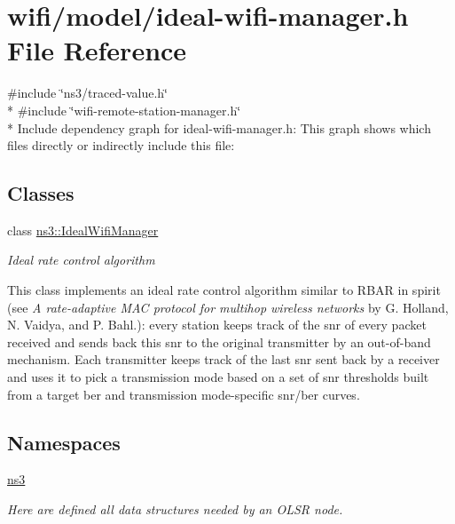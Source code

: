\hypertarget{ideal-wifi-manager_8h}{}\section{wifi/model/ideal-\/wifi-\/manager.h File Reference}
\label{ideal-wifi-manager_8h}
{\ttfamily \#include \char`\"{}ns3/traced-\/value.\+h\char`\"{}}\\*
{\ttfamily \#include \char`\"{}wifi-\/remote-\/station-\/manager.\+h\char`\"{}}\\*
Include dependency graph for ideal-\/wifi-\/manager.h\+:
This graph shows which files directly or indirectly include this file\+:
\subsection*{Classes}
\begin{DoxyCompactItemize}
\item 
class \hyperlink{classns3_1_1IdealWifiManager}{ns3\+::\+Ideal\+Wifi\+Manager}
\begin{DoxyCompactList}\small\item\em Ideal rate control algorithm

This class implements an \textquotesingle{}ideal\textquotesingle{} rate control algorithm similar to R\+B\+AR in spirit (see {\itshape A rate-\/adaptive M\+AC protocol for multihop wireless networks} by G. Holland, N. Vaidya, and P. Bahl.)\+: every station keeps track of the snr of every packet received and sends back this snr to the original transmitter by an out-\/of-\/band mechanism. Each transmitter keeps track of the last snr sent back by a receiver and uses it to pick a transmission mode based on a set of snr thresholds built from a target ber and transmission mode-\/specific snr/ber curves. \end{DoxyCompactList}\end{DoxyCompactItemize}
\subsection*{Namespaces}
\begin{DoxyCompactItemize}
\item 
 \hyperlink{namespacens3}{ns3}
\begin{DoxyCompactList}\small\item\em Here are defined all data structures needed by an O\+L\+SR node. \end{DoxyCompactList}\end{DoxyCompactItemize}
